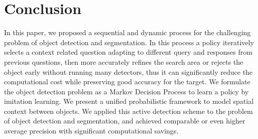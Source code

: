 \section{Conclusion}
In this paper, we proposed a sequential and dynamic process for the challenging problem of object detection and segmentation. In this process a policy iteratively selects a context related question adapting to different query and responses from previous questions, then more accurately refines the search area or rejects the object early without running many detectors, thus it can significantly reduce the computational cost while preserving good accuracy for the target. We formulate the object detection problem as a Markov Decision Process to learn a policy by imitation learning. We present a unified probabilistic framework to model spatial context between objects. We applied this active detection scheme to the problem of object detection and segmentation, and achieved comparable or even higher average precision with significant computational savings. 